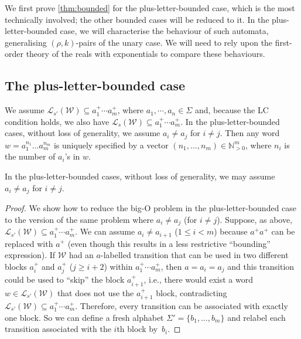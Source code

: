 \documentclass{lmcs}
\theoremstyle{plain}
\theoremstyle{definition}
\theoremstyle{remark}
\newcommand\lng[2]{\mathcal{L}_{#1}(#2)}
\newcommand\chr{a}
\newcommand\wa{\mathcal{W}}
\begin{document}
We first prove \cref{thm:bounded} for the plus-letter-bounded case, which is the most technically involved; the other bounded cases will be reduced to it.
 In the plus-letter-bounded case, we will characterise the behaviour of such automata, generalising $(\rho,k)$-pairs of the unary case.
We will  need to rely upon the first-order theory of the reals with exponentials to compare these behaviours.

\subsection{The plus-letter-bounded case}
\label{sec:plusletterbounded}
We assume $\lng{s'}{\wa} \subseteq a_1^+\cdots a_m^+$, where $a_1, \cdots, a_n\in\Sigma$ and, because the LC condition holds, we also have  $\lng{s}{\wa} \subseteq a_1^+\cdots a_m^+$. In the plus-letter-bounded cases, without loss of generality, we assume $\chr_i\ne \chr_j$ for $i\neq j$.  Then any word $w = a_1^{n_1}\dots a_m^{n_m}$ is uniquely specified by a vector $(n_1,\dots,n_m)\in \mathbb{N}^m_{>0}$, where $n_i$ is the number of $a_i$'s in $w$.

\begin{prop}\label{claim:plbadditionaform}
In the plus-letter-bounded cases, without loss of generality, we may assume $\chr_i\ne \chr_j$ for $i\neq j$.
\end{prop}
\begin{proof}
We show how to reduce the big-O problem in the plus-letter-bounded case to the version of the same problem where $\chr_i\ne \chr_j$ (for $i\neq j$). Suppose, as above, $\lng{s'}{\wa} \subseteq a_1^+\cdots a_m^+$.
We can assume $a_i\neq a_{i+1}$ ($1\le i < m$) because $a^+ a^+$ can be replaced with $a^+$ (even though this results in a less restrictive ``bounding'' expression).
If $\wa$ had an $a$-labelled transition that can be used in two different blocks $a_i^+$ and $a_j^+$ ($j \ge i+2$) within $a_1^+\cdots a_m^+$, then $a = a_i = a_j$ and this transition could be used to ``skip'' the block $a_{i+1}^+$, i.e., there would exist a word $w \in \lng{s'}{\wa}$ that does not use the $a_{i+1}^+$ block, contradicting  $\lng{s'}{\wa} \subseteq a_1^+\cdots a_m^+$.
Therefore, every transition can be associated with exactly one block.
So we can define a fresh alphabet $\Sigma' = \{b_1, \ldots, b_m\}$ and relabel each transition associated with the $i$th block by~$b_i$.
\end{proof}
\end{document}
